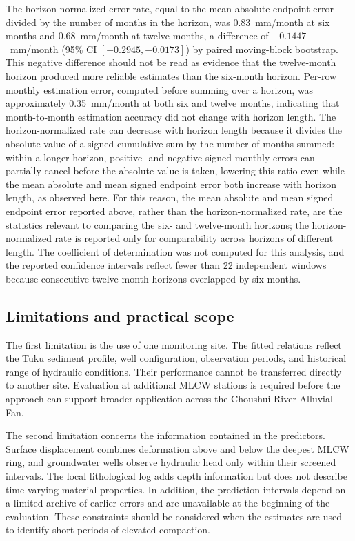 The horizon-normalized error rate, equal to the mean absolute endpoint error divided by the number of months in the horizon, was 0.83~mm/month at six months and 0.68~mm/month at twelve months, a difference of $-0.1447$~mm/month (95\% CI $[-0.2945,-0.0173]$) by paired moving-block bootstrap. This negative difference should not be read as evidence that the twelve-month horizon produced more reliable estimates than the six-month horizon. Per-row monthly estimation error, computed before summing over a horizon, was approximately 0.35~mm/month at both six and twelve months, indicating that month-to-month estimation accuracy did not change with horizon length. The horizon-normalized rate can decrease with horizon length because it divides the absolute value of a signed cumulative sum by the number of months summed: within a longer horizon, positive- and negative-signed monthly errors can partially cancel before the absolute value is taken, lowering this ratio even while the mean absolute and mean signed endpoint error both increase with horizon length, as observed here. For this reason, the mean absolute and mean signed endpoint error reported above, rather than the horizon-normalized rate, are the statistics relevant to comparing the six- and twelve-month horizons; the horizon-normalized rate is reported only for comparability across horizons of different length. The coefficient of determination was not computed for this analysis, and the reported confidence intervals reflect fewer than 22 independent windows because consecutive twelve-month horizons overlapped by six months.

\subsection{Limitations and practical scope}
\label{subsec:discussion_limitations}

The first limitation is the use of one monitoring site. The fitted relations reflect the Tuku sediment profile, well configuration, observation periods, and historical range of hydraulic conditions. Their performance cannot be transferred directly to another site. Evaluation at additional MLCW stations is required before the approach can support broader application across the Choushui River Alluvial Fan.

The second limitation concerns the information contained in the predictors. Surface displacement combines deformation above and below the deepest MLCW ring, and groundwater wells observe hydraulic head only within their screened intervals. The local lithological log adds depth information but does not describe time-varying material properties. In addition, the prediction intervals depend on a limited archive of earlier errors and are unavailable at the beginning of the evaluation. These constraints should be considered when the estimates are used to identify short periods of elevated compaction.

